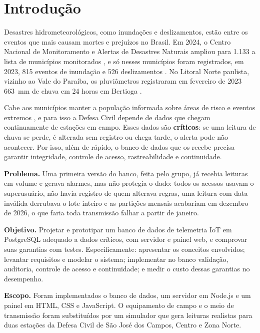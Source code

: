\chapter{Introdução}\label{cap:introducao}

Desastres hidrometeorológicos, como inundações e deslizamentos, estão entre os eventos que mais causam mortes e prejuízos no Brasil. Em 2024, o Centro Nacional de Monitoramento e Alertas de Desastres Naturais ampliou para 1.133 a lista de municípios monitorados \parencite{cemaden2024}, e só nesses municípios foram registrados, em 2023, 815 eventos de inundação e 526 deslizamentos \parencite[p.~70]{nakano2024}. No Litoral Norte paulista, vizinho ao Vale do Paraíba, os pluviômetros registraram em fevereiro de 2023 663~mm de chuva em 24 horas em Bertioga \parencite{metsul2023}.

Cabe aos municípios manter a população informada sobre áreas de risco e eventos extremos \parencite{lei12608}, e para isso a Defesa Civil depende de dados que chegam continuamente de estações em campo. Esses dados são \textbf{críticos}: se uma leitura de chuva se perde, é alterada sem registro ou chega tarde, o alerta pode não acontecer. Por isso, além de rápido, o banco de dados que os recebe precisa garantir integridade, controle de acesso, rastreabilidade e continuidade.

\textbf{Problema.} Uma primeira versão do banco, feita pelo grupo, já recebia leituras em volume e gerava alarmes, mas não protegia o dado: todos os acessos usavam o superusuário, não havia registro de quem alterava regras, uma leitura com data inválida derrubava o lote inteiro e as partições mensais acabariam em dezembro de 2026, o que faria toda transmissão falhar a partir de janeiro.

\textbf{Objetivo.} Projetar e prototipar um banco de dados de telemetria IoT em PostgreSQL adequado a dados críticos, com servidor e painel web, e comprovar suas garantias com testes. Especificamente: apresentar os conceitos envolvidos; levantar requisitos e modelar o sistema; implementar no banco validação, auditoria, controle de acesso e continuidade; e medir o custo dessas garantias no desempenho.

\textbf{Escopo.} Foram implementados o banco de dados, um servidor em Node.js e um painel em HTML, CSS e JavaScript. O equipamento de campo e o meio de transmissão foram substituídos por um simulador que gera leituras realistas para duas estações da Defesa Civil de São José dos Campos, Centro e Zona Norte.
